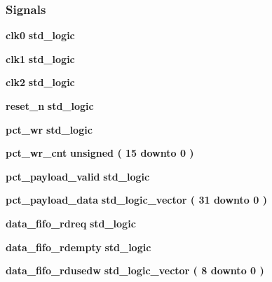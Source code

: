 \subsubsection*{Signals}
 \begin{DoxyCompactItemize}
\item 
{\bf clk0} {\bfseries \textcolor{comment}{std\+\_\+logic}\textcolor{vhdlchar}{ }} 
\item 
{\bf clk1} {\bfseries \textcolor{comment}{std\+\_\+logic}\textcolor{vhdlchar}{ }} 
\item 
{\bf clk2} {\bfseries \textcolor{comment}{std\+\_\+logic}\textcolor{vhdlchar}{ }} 
\item 
{\bf reset\+\_\+n} {\bfseries \textcolor{comment}{std\+\_\+logic}\textcolor{vhdlchar}{ }} 
\item 
{\bf pct\+\_\+wr} {\bfseries \textcolor{comment}{std\+\_\+logic}\textcolor{vhdlchar}{ }} 
\item 
{\bf pct\+\_\+wr\+\_\+cnt} {\bfseries \textcolor{comment}{unsigned}\textcolor{vhdlchar}{ }\textcolor{vhdlchar}{(}\textcolor{vhdlchar}{ }\textcolor{vhdlchar}{ } \textcolor{vhdldigit}{15} \textcolor{vhdlchar}{ }\textcolor{keywordflow}{downto}\textcolor{vhdlchar}{ }\textcolor{vhdlchar}{ } \textcolor{vhdldigit}{0} \textcolor{vhdlchar}{ }\textcolor{vhdlchar}{)}\textcolor{vhdlchar}{ }} 
\item 
{\bf pct\+\_\+payload\+\_\+valid} {\bfseries \textcolor{comment}{std\+\_\+logic}\textcolor{vhdlchar}{ }} 
\item 
{\bf pct\+\_\+payload\+\_\+data} {\bfseries \textcolor{comment}{std\+\_\+logic\+\_\+vector}\textcolor{vhdlchar}{ }\textcolor{vhdlchar}{(}\textcolor{vhdlchar}{ }\textcolor{vhdlchar}{ } \textcolor{vhdldigit}{31} \textcolor{vhdlchar}{ }\textcolor{keywordflow}{downto}\textcolor{vhdlchar}{ }\textcolor{vhdlchar}{ } \textcolor{vhdldigit}{0} \textcolor{vhdlchar}{ }\textcolor{vhdlchar}{)}\textcolor{vhdlchar}{ }} 
\item 
{\bf data\+\_\+fifo\+\_\+rdreq} {\bfseries \textcolor{comment}{std\+\_\+logic}\textcolor{vhdlchar}{ }} 
\item 
{\bf data\+\_\+fifo\+\_\+rdempty} {\bfseries \textcolor{comment}{std\+\_\+logic}\textcolor{vhdlchar}{ }} 
\item 
{\bf data\+\_\+fifo\+\_\+rdusedw} {\bfseries \textcolor{comment}{std\+\_\+logic\+\_\+vector}\textcolor{vhdlchar}{ }\textcolor{vhdlchar}{(}\textcolor{vhdlchar}{ }\textcolor{vhdlchar}{ } \textcolor{vhdldigit}{8} \textcolor{vhdlchar}{ }\textcolor{keywordflow}{downto}\textcolor{vhdlchar}{ }\textcolor{vhdlchar}{ } \textcolor{vhdldigit}{0} \textcolor{vhdlchar}{ }\textcolor{vhdlchar}{)}\textcolor{vhdlchar}{ }} 

\end{DoxyCompactItemize}
